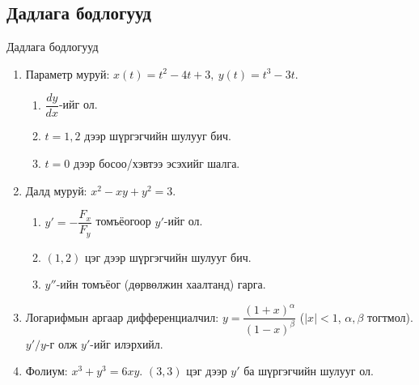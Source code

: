 \subsection{Дадлага бодлогууд}
\begin{frame}[allowframebreaks]{Дадлага бодлогууд}
\begin{enumerate}
    \item 
Параметр муруй: $x(t)=t^2-4t+3,\ y(t)=t^3-3t$. 
\begin{enumerate}
  \item $\dfrac{dy}{dx}$-ийг ол.
  \item $t=1,2$ дээр шүргэгчийн шулууг бич.
  \item $t=0$ дээр босоо/хэвтээ эсэхийг шалга.
\end{enumerate}
\item Далд муруй: $x^2-xy+y^2=3$.
\begin{enumerate}
  \item $y'=-\dfrac{F_x}{F_y}$ томъёогоор $y'$-ийг ол.
  \item $(1,2)$ цэг дээр шүргэгчийн шулууг бич.
  \item $y''$-ийн томъёог (дөрвөлжин хаалтанд) гарга.
\end{enumerate}
\item Логарифмын аргаар дифференциалчил: $y=\dfrac{(1+x)^{\alpha}}{(1-x)^{\beta}}$ \;($|x|<1$,\; $\alpha,\beta$ тогтмол). $y'/y$-г олж $y'$-ийг илэрхийл.
\item Фолиум: $x^3+y^3=6xy$. $(3,3)$ цэг дээр $y'$ ба шүргэгчийн шулууг ол.
\end{enumerate}
\end{frame}



